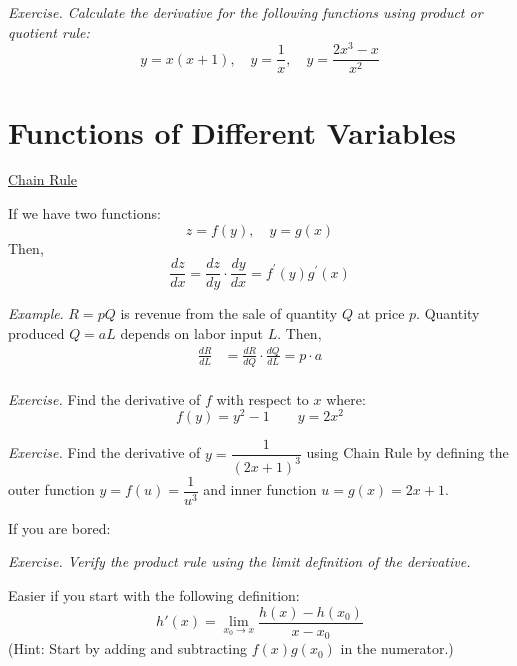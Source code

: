 \documentclass{./../../latex/handout}
\begin{document}
\newpage
\textit{Exercise. Calculate the derivative for the following functions using product or quotient rule:}
\[ y = x(x+1), \quad y=\frac{1}{x}, \quad y = \frac{2x^3-x}{x^2}\]

\newpage 
\section*{Functions of Different Variables}

\underline{Chain Rule} 

If we have two functions:
\[ z=f(y), \quad y=g(x) \]
Then, 
\[\frac{d z}{d x}=\frac{d z}{d y} \cdot \frac{d y}{d x}=f^{\prime}(y) g^{\prime}(x) \]

\textit{Example}. $R = p Q $ is revenue from the sale of quantity $Q$ at price $p$. Quantity produced $Q= a L$ depends on labor input $L$. Then,
\[
\begin{aligned}
\frac{d R}{d L} &=\frac{d R}{d Q} \cdot \frac{d Q}{d L} = p \cdot a\\
\end{aligned}
\]


\textit{Exercise.} Find the derivative of $f$ with respect to $x$ where:
\[ f(y) = y^2-1 \quad \quad y = 2x^2  \]

\vspace{3cm}
\textit{Exercise.} Find the derivative of $y = \dfrac{1}{(2x+1)^3}$ using Chain Rule by defining the outer function $y = f(u) = \dfrac{1}{u^3}$ and inner function $u = g(x) = 2x+1$. 

\newpage

If you are bored:

\textit{Exercise. Verify the product rule using the limit definition of the derivative.} 

Easier if you start with the following definition:
\[ h'(x)=\lim _{x_0 \rightarrow x}  \frac{h(x)-h(x_0)}{x-x_0} \]
(Hint: Start by adding and subtracting $f(x)g(x_0)$ in the numerator.)
\end{document}
